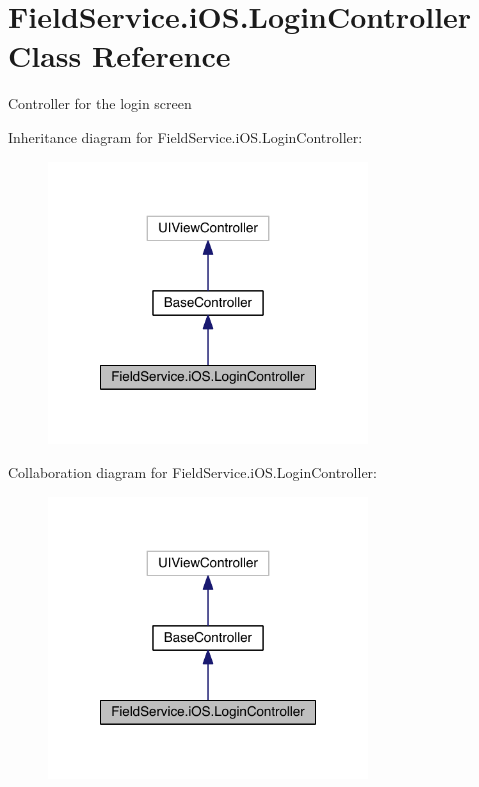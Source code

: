 \hypertarget{class_field_service_1_1i_o_s_1_1_login_controller}{\section{Field\+Service.\+i\+O\+S.\+Login\+Controller Class Reference}
\label{class_field_service_1_1i_o_s_1_1_login_controller}
}


Controller for the login screen  




Inheritance diagram for Field\+Service.\+i\+O\+S.\+Login\+Controller\+:
\nopagebreak
\begin{figure}[H]
\begin{center}
\leavevmode
\includegraphics[width=240pt]{class_field_service_1_1i_o_s_1_1_login_controller__inherit__graph}
\end{center}
\end{figure}


Collaboration diagram for Field\+Service.\+i\+O\+S.\+Login\+Controller\+:
\nopagebreak
\begin{figure}[H]
\begin{center}
\leavevmode
\includegraphics[width=240pt]{class_field_service_1_1i_o_s_1_1_login_controller__coll__graph}
\end{center}
\end{figure}
